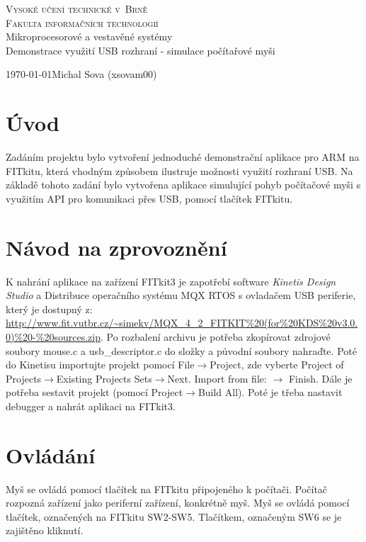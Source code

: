 \documentclass{article}
\begin{document}
\begin{titlepage}
\begin{center}
\textsc{\Huge
Vysoké učení technické v~Brně\\[0.3em]
\huge Fakulta informačních technologií}\\
{\LARGE Mikroprocesorové a vestavěné systémy\\[0.3em]
\Huge Demonstrace využití USB rozhraní - simulace počítařové myši}\\
\end{center}
{\Large \today \hfill Michal Sova (xsovam00)}
\end{titlepage}

\section{Úvod}
Zadáním projektu bylo vytvoření jednoduché demonstrační aplikace pro ARM na FITkitu, která vhodným způsobem ilustruje možnosti využití rozhraní USB.
Na základě tohoto zadání bylo vytvořena aplikace simulující pohyb počítačové myši s využitím API pro komunikaci přes USB\cite{USB}, pomocí tlačítek FITkitu.


\section{Návod na zprovoznění}
K nahrání aplikace na zařízení FITkit3 je zapotřebí software 
\textit{Kinetis Design Studio} a Distribuce operačního systému MQX RTOS s ovladačem USB periferie, který je dostupný z: 
\url{http://www.fit.vutbr.cz/~simekv/MQX_4_2_FITKIT%20(for%20KDS%20v3.0.0)%20-%20sources.zip}. 
Po rozbalení archivu je potřeba zkopírovat zdrojové soubory mouse.c a usb\_descriptor.c do složky 
a původní soubory nahraďte. Poté do Kinetisu importujte projekt pomocí File$\rightarrow$Project, zde vyberte Project of Projects$\rightarrow$Existing Projects Sets$\rightarrow$Next. Import from file: $\rightarrow$ Finish. Dále je potřeba sestavit projekt (pomocí Project$\rightarrow$Build All). Poté je třeba nastavit debugger a nahrát aplikaci na FITkit3.
\section{Ovládání}
Myš se ovládá pomocí tlačítek na FITkitu připojeného k počítači. Počítač rozpozná zařízení jako periferní zařízení, konkrétně myš. Myš se ovládá pomocí tlačítek, označených na FITkitu SW2-SW5. Tlačítkem, označeným SW6 se je zajištěno kliknutí.
\end{document}
